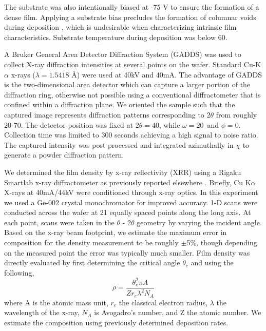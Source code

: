 \noindent The substrate was also intentionally biased at -75 V to ensure the formation of a dense film. Applying a substrate bias precludes the formation of columnar voids during deposition \cite{Barron2009}, which is undesirable when characterizing intrinsic film characteristics. Substrate temperature during deposition was below 60\textcelsius. 

A Bruker General Area Detector Diffraction System (GADDS) was used to collect X-ray diffraction intensities at several points on the wafer. Standard Cu-K$\alpha$ x-rays  ($\lambda = 1.5418$ \AA) were used at 40kV and 40mA. The advantage of GADDS is the two-dimensional area detector which can capture a larger portion of the diffraction ring, otherwise not possible using a conventional diffractometer that is confined within a diffraction plane. We oriented the sample such that the captured image represents diffraction patterns corresponding to $2\theta$ from roughly 20-70\textdegree. The detector position was fixed at $2\theta = 40$\textdegree, while $\omega = 20$\textdegree\ and $\phi = 0$\textdegree. Collection time was limited to 300 seconds achieving a high signal to noise ratio. The captured intensity was post-processed and integrated azimuthally in $\chi$ to generate a powder diffraction pattern.    

We determined the film density by x-ray reflectivity (XRR) using a Rigaku Smartlab x-ray diffractometer as previously reported elsewhere \cite{Naoi2018jap}. Briefly, Cu K$\alpha$ X-rays at 40mA/44kV were conditioned through x-ray optics. In this experiment we used a Ge-002 crystal monochromator for improved accuracy. 1-D scans were conducted across the wafer at 21 equally spaced points along the long axis. At each point, scans were taken in the $\theta$ - 2$\theta$ geometry by varying the incident angle. Based on the x-ray beam footprint, we estimate the maximum error in composition for the density measurement to be roughly $\pm$5$\%$, though depending on the measured point the error was typically much smaller. Film density was directly evaluated by first determining the critical angle $\theta_{c}$ \cite{Parratt1954} and using the following,
\begin{equation}
\rho = \frac{\theta_{c}^{2}\pi A}{Zr_{e}\lambda^{2} N_{A}} 
\end{equation}
where A is the atomic mass unit, $r_{e}$ the classical electron radius, $\lambda$ the wavelength of the x-ray, $N_{A}$ is Avogadro’s number, and Z the atomic number. We estimate the composition using previously determined deposition rates. 


